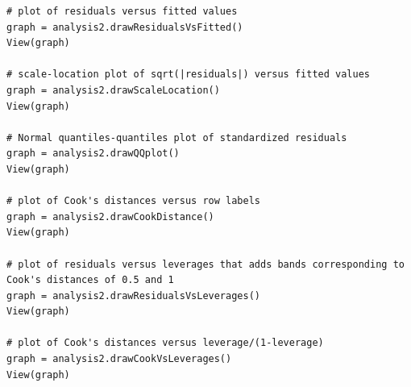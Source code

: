 \begin{lstlisting}[style=pythonStyle,basicstyle=\footnotesize]
# plot of residuals versus fitted values
graph = analysis2.drawResidualsVsFitted()
View(graph)

# scale-location plot of sqrt(|residuals|) versus fitted values
graph = analysis2.drawScaleLocation()
View(graph)

# Normal quantiles-quantiles plot of standardized residuals
graph = analysis2.drawQQplot()
View(graph)

# plot of Cook's distances versus row labels
graph = analysis2.drawCookDistance()
View(graph)

# plot of residuals versus leverages that adds bands corresponding to Cook's distances of 0.5 and 1
graph = analysis2.drawResidualsVsLeverages()
View(graph)

# plot of Cook's distances versus leverage/(1-leverage)
graph = analysis2.drawCookVsLeverages()
View(graph)

\end{lstlisting}

